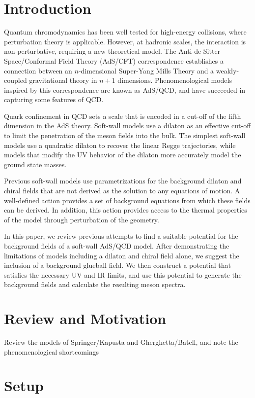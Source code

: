 \section{Introduction}

Quantum chromodynamics has been well tested for high-energy collisions, where perturbation theory is applicable. However, at hadronic scales, the interaction is non-perturbative, requiring a new theoretical model. The Anti-de Sitter Space/Conformal Field Theory (AdS/CFT) correspondence establishes a connection between an $n$-dimensional Super-Yang Mills Theory and a weakly-coupled gravitational theory in $n+1$ dimensions. Phenomenological models inspired by this correspondence are known as AdS/QCD, and have succeeded in capturing some features of QCD. 

Quark confinement in QCD sets a scale that is encoded in a cut-off of the fifth dimension in the AdS theory. Soft-wall models use a dilaton as an effective cut-off to limit the penetration of the meson fields into the bulk. The simplest soft-wall models use a quadratic dilaton to recover the linear Regge trajectories, while models that modify the UV behavior of the dilaton more accurately model the ground state masses.

Previous soft-wall models use parametrizations for the background dilaton and chiral fields that are not derived as the solution to any equations of motion. A well-defined action provides a set of background equations from which these fields can be derived. In addition, this action provides access to the thermal properties of the model through perturbation of the geometry.

In this paper, we review previous attempts to find a suitable potential for the background fields of a soft-wall AdS/QCD model. After demonstrating the limitations of models including a dilaton and chiral field alone, we suggest the inclusion of a background glueball field. We then construct a potential that satisfies the necessary UV and IR limits, and use this potential to generate the background fields and calculate the resulting meson spectra.

\section{Review and Motivation}

Review the models of Springer/Kapusta and Gherghetta/Batell, and note the phenomenological shortcomings

\section{Setup}


